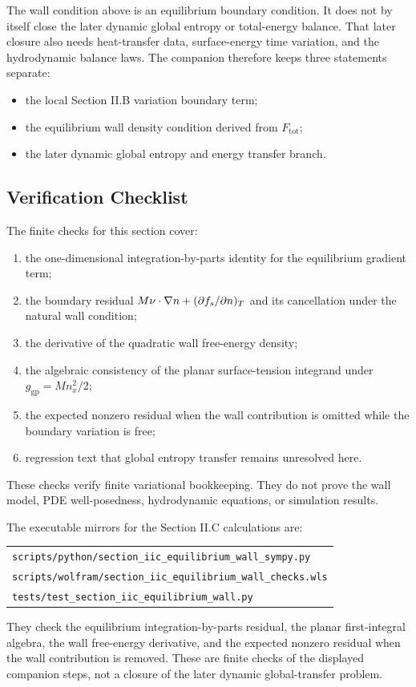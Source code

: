 The wall condition above is an equilibrium boundary condition.  It does not by
itself close the later dynamic global entropy or total-energy balance.  That
later closure also needs heat-transfer data, surface-energy time variation, and
the hydrodynamic balance laws.  The companion therefore keeps three statements
separate:

\begin{itemize}
\item the local Section II.B variation boundary term;
\item the equilibrium wall density condition derived from \(F_{\mathrm{tot}}\);
\item the later dynamic global entropy and energy transfer branch.
\end{itemize}

\subsection{Verification Checklist}

The finite checks for this section cover:

\begin{enumerate}
\item the one-dimensional integration-by-parts identity for the equilibrium
  gradient term;
\item the boundary residual
  \(M\nu\cdot\nabla n+(\partial f_s/\partial n)_T\) and its cancellation under
  the natural wall condition;
\item the derivative of the quadratic wall free-energy density;
\item the algebraic consistency of the planar surface-tension integrand under
  \(g_{\mathrm{gp}}=Mn_x^2/2\);
\item the expected nonzero residual when the wall contribution is omitted while
  the boundary variation is free;
\item regression text that global entropy transfer remains unresolved here.
\end{enumerate}

These checks verify finite variational bookkeeping.  They do not prove the wall
model, PDE well-posedness, hydrodynamic equations, or simulation results.

The executable mirrors for the Section II.C calculations are:
\begin{center}
\small
\begin{tabular}{@{}l@{}}
\texttt{scripts/python/section\_iic\_equilibrium\_wall\_sympy.py}\\
\texttt{scripts/wolfram/section\_iic\_equilibrium\_wall\_checks.wls}\\
\texttt{tests/test\_section\_iic\_equilibrium\_wall.py}
\end{tabular}
\end{center}
They check the equilibrium integration-by-parts residual, the planar
first-integral algebra, the wall free-energy derivative, and the expected
nonzero residual when the wall contribution is removed.  These are finite
checks of the displayed companion steps, not a closure of the later dynamic
global-transfer problem.


